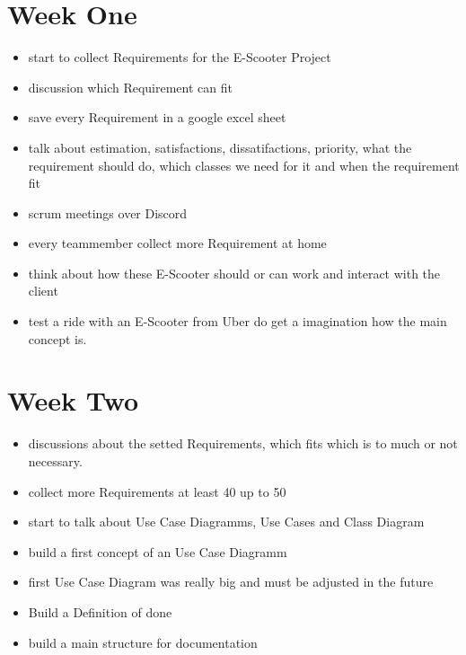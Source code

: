 \documentclass[a4paper, 12pt]{article}
\begin{document}
\section{Week One}
\begin{itemize}
\item start to collect Requirements for the E-Scooter Project
\item discussion which Requirement can fit
\item save every Requirement in a google excel sheet
\item talk about estimation, satisfactions, dissatifactions, priority, what the requirement should do, which classes we need for it and when the requirement fit
\item scrum meetings over Discord
\item every teammember collect more Requirement at home 
\item think about how these E-Scooter should or can work and interact with the client
\item test a ride with an E-Scooter from Uber do get a imagination how the main concept is.

\end{itemize}

\section{Week Two}
\begin{itemize}
\item discussions about the setted Requirements, which fits which is to much or not necessary. 
\item collect more Requirements at least 40 up to 50 
\item start to talk about Use Case Diagramms, Use Cases and Class Diagram
\item build a first concept of an Use Case Diagramm
\item first Use Case Diagram was really big and must be adjusted in the future
\item Build a Definition of done 
\item build a main structure for documentation
\end{itemize}
\end{document}
